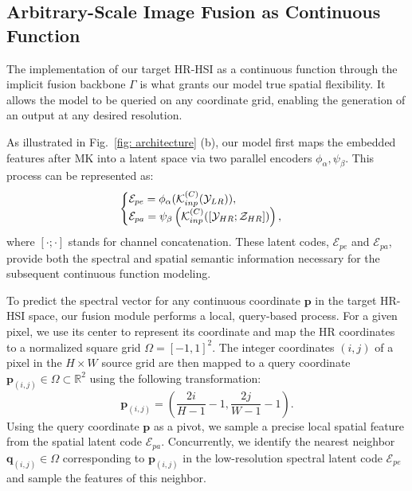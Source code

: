 \subsection{Arbitrary-Scale Image Fusion as Continuous Function}
\label{subsec:inr}
The implementation of our target HR-HSI as a continuous function through the implicit fusion backbone $\Gamma$ is what grants our model true spatial flexibility. It allows the model to be queried on any coordinate grid, enabling the generation of an output at any desired resolution.

As illustrated in Fig.~\ref{fig: architecture} (b), our model first maps the embedded features after MK into a latent space via two parallel encoders $ \phi_\alpha,  \psi_\beta$. This process can be represented as:
\begin{equation}
\begin{cases} 
\mathcal E_{pe} = \phi_{\alpha}(\mathcal K_{inp}^{(C)}(\mathcal{Y}_{LR})), \\
\mathcal{E}_{pa} = \psi_{\beta}\left(\mathcal K_{inp}^{(C)}([\mathcal{Y}_{HR}; \mathcal{Z}_{HR}])\right), \notag
\end{cases}
\end{equation}
where $[\cdot;\cdot]$ stands for channel concatenation. These latent codes, $\mathcal{E}_{pe}$ and $\mathcal{E}_{pa}$, provide both the spectral and spatial semantic information necessary for the subsequent continuous function modeling.

To predict the spectral vector for any continuous coordinate $\mathbf{p}$ in the target HR-HSI space, our fusion module performs a local, query-based process. For a given pixel, we use its center to represent its coordinate and map the HR coordinates to a normalized square grid $\Omega = [-1,1]^2$. The integer coordinates $(i,j)$ of a pixel in the $H\times W$ source grid are then mapped to a query coordinate $\mathbf p_{(i,j)}\in \Omega \subset \mathbb R^2$ using the following transformation:
\begin{equation}
    \mathbf{p}_{(i,j)} = \left( \frac{2i}{H-1} - 1, \frac{2j}{W-1} - 1 \right).
\end{equation}
Using the query coordinate $\mathbf{p}$ as a pivot, we sample a precise local spatial feature from the spatial latent code $\mathcal{E}_{pa}$. Concurrently, we identify the nearest neighbor $\mathbf{q}_{(i,j)}\in \Omega$ corresponding to $\mathbf{p}_{(i,j)}$ in the low-resolution spectral latent code $\mathcal{E}_{pe}$ and sample the features of this neighbor.

